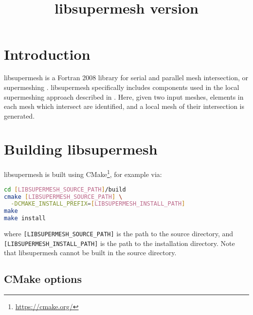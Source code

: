 \documentclass{article}
\begin{document}
\title{libsupermesh version \version}
\date{}
\author{}

\maketitle

\tableofcontents

\section{Introduction}

libsupermesh is a Fortran 2008 library for serial and parallel mesh
intersection, or supermeshing \citep{farrell2009,farrell2009a}. libsupermesh
specifically includes components used in the local supermeshing approach
described in \citet{farrell2011} \citep[see also][]{gander2009,gander2013}.
Here, given two input meshes, elements in each mesh which intersect are
identified, and a local mesh of their intersection is generated.

\section{Building libsupermesh}

libsupermesh is built using CMake\footnote{\url{https://cmake.org/}}, for
example via:
\begin{lstlisting}[language=sh,frame=single]
cd [LIBSUPERMESH_SOURCE_PATH]/build
cmake [LIBSUPERMESH_SOURCE_PATH] \
  -DCMAKE_INSTALL_PREFIX=[LIBSUPERMESH_INSTALL_PATH]
make
make install
\end{lstlisting}
where \verb+[LIBSUPERMESH_SOURCE_PATH]+ is the path to the source directory, and
\linebreak \verb+[LIBSUPERMESH_INSTALL_PATH]+ is the path to the installation
directory. Note that libsupermesh cannot be built in the source directory.

\subsection*{CMake options}
\end{document}

